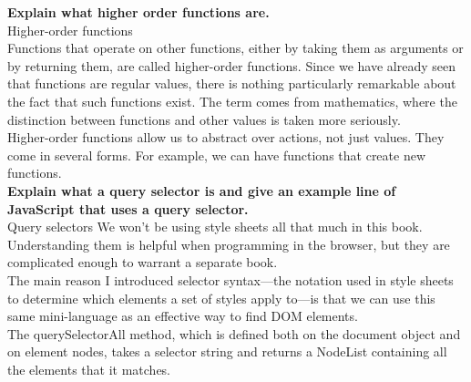 \documentclass[10pt,a4paper]{article}
\begin{document}
\noindent
\textbf{Explain what higher order functions are.}\\

Higher-order functions\\
Functions that operate on other functions, either by taking them as arguments or by returning them, are called higher-order functions. Since we have already seen that functions are regular values, there is nothing particularly remarkable about the fact that such functions exist. The term comes from mathematics, where the distinction between functions and other values is taken more seriously.\\

Higher-order functions allow us to abstract over actions, not just values. They come in several forms. For example, we can have functions that create new functions.\\

\noindent
\textbf{Explain what a query selector is and give an example line of JavaScript that uses a query selector.}\\

Query selectors
We won’t be using style sheets all that much in this book. Understanding them is helpful when programming in the browser, but they are complicated enough to warrant a separate book.\\

The main reason I introduced selector syntax—the notation used in style sheets to determine which elements a set of styles apply to—is that we can use this same mini-language as an effective way to find DOM elements.
\\
The querySelectorAll method, which is defined both on the document object and on element nodes, takes a selector string and returns a NodeList containing all the elements that it matches.\\
\end{document}
